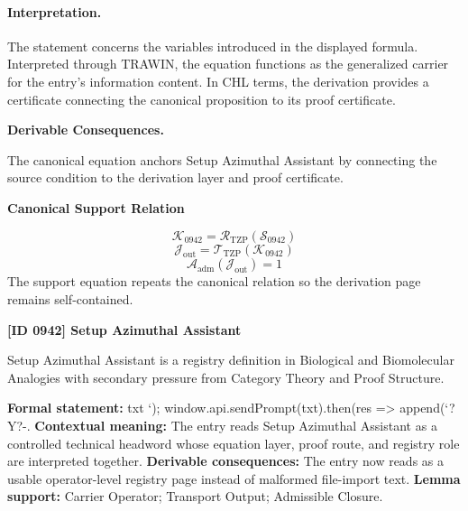 \paragraph{Interpretation.}
The statement concerns the variables introduced in the displayed formula. Interpreted through TRAWIN, the equation functions as the generalized carrier for the entry’s information content. In CHL terms, the derivation provides a certificate connecting the canonical proposition to its proof certificate.

\par\vspace{0.35em}
\noindent\textbf{Derivable Consequences.}\quad
\begingroup
\footnotesize
\raggedright
The canonical equation anchors Setup Azimuthal Assistant by connecting the source condition to the derivation layer and proof certificate.
\par\endgroup

\noindent\textbf{Canonical Support Relation}\par
\[
\mathcal{K}_{0942}=\mathcal{R}_{\mathrm{TZP}}\!\left(\mathcal{S}_{0942}\right)
\]
\[
\mathcal{J}_{\mathrm{out}}=\mathcal{T}_{\mathrm{TZP}}\!\left(\mathcal{K}_{0942}\right)
\]
\[
\mathcal{A}_{\mathrm{adm}}\!\left(\mathcal{J}_{\mathrm{out}}\right)=1
\]
\noindent The support equation repeats the canonical relation so the derivation page remains self-contained.\par

\clearpage
\noindent\textbf{[ID 0942] Setup Azimuthal Assistant}\par
\vspace{0.35em}
\begingroup\small
{}
Setup Azimuthal Assistant is a registry definition in Biological and Biomolecular Analogies with secondary pressure from Category Theory and Proof Structure.

\begingroup\footnotesize\setlength{\emergencystretch}{3em}\sloppy
\textbf{Formal statement:} txt `); window.api.sendPrompt(txt).then(res => append(`?Y?-. \textbf{Contextual meaning:} The entry reads Setup Azimuthal Assistant as a controlled technical headword whose equation layer, proof route, and registry role are interpreted together. \textbf{Derivable consequences:} The entry now reads as a usable operator-level registry page instead of malformed file-import text. \textbf{Lemma support:} Carrier Operator; Transport Output; Admissible Closure.\par
\endgroup

